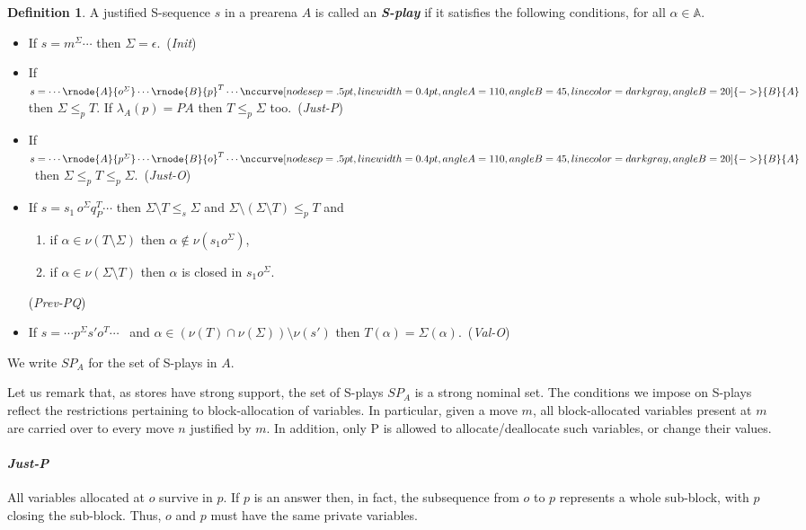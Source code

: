 \documentclass{CSML}
\theoremstyle{definition}\newtheorem{definition}[thm]{Definition}
\theoremstyle{definition}\newtheorem{example}[thm]{Example}
\theoremstyle{definition}\newtheorem{proposition}[thm]{Proposition}
\theoremstyle{definition}\newtheorem{lemma}[thm]{Lemma}
\theoremstyle{definition}\newtheorem{theorem}[thm]{Theorem}
\theoremstyle{definition}\newtheorem{corollary}[thm]{Corollary}
\theoremstyle{definition}\newtheorem{remark}[thm]{Remark}
\renewcommand\Sigma{\varSigma}
\newcommand\justf[3][]{\nccurve[nodesep=.5pt,linewidth=0.4pt,angleA=110,angleB=45,linecolor=darkgray#1]{->}{#2}{#3}}
\newcommand\Tau{T}
\newcommand\ee\epsilon
\newcommand\remv{\setminus}
\newcommand\Splays[1]{\mathit{SP}_{#1}}
\newcommand\boldemph[1]{\emph{\textbf{#1}}}
\newcommand\A{\mathbb{A}}
\newcommand\Substore{\leq_p}
\newcommand\substorE{\leq_s}
\newcommand\na\alpha
\begin{document}
\begin{definition}\label{def:splay}
A justified S-sequence $s$ in a prearena $A$ is called an \boldemph{S-play} if it satisfies the following conditions, for all $\na\in\A$.
\begin{itemize}
  \item If $s=m^\Sigma\cdots$ then $\Sigma=\ee$.\ ({\em Init})
  \item If $s=\cdots \rnode{A}{o^{\Sigma}}\cdots \rnode{B}{p}^\Tau\cdots\justf[,angleB=20]{B}{A}$ then $\Sigma\Substore\Tau$. If $\lambda_A(p)=PA$ then $\Tau\Substore\Sigma$ too.\ ({\em Just-P})
 \item If $s=\cdots \rnode{A}{p^{\Sigma}} \cdots \rnode{B}{o}^\Tau\cdots\justf[,angleB=20]{B}{A}$ \ then $\Sigma\Substore\Tau\Substore\Sigma$.\ ({\em Just-O})
  \item If $s=s_1\, o^\Sigma q_P^\Tau\cdots$ then $\Sigma\remv\Tau\substorE\Sigma$ and $\Sigma\remv(\Sigma\remv\Tau)\Substore\Tau$ and 
  \begin{enumerate}[label=\({\alph*}]\item if $\na\in\nu(\Tau\remv\Sigma)$ then $\na\notin\nu(s_1o^\Sigma)$,
    \item if $\na\in\nu(\Sigma\remv\Tau)$ then $\na$ is closed in $s_1o^\Sigma$.
  \end{enumerate}({\em Prev-PQ})
  \item If $s=\cdots p^\Sigma s'o^\Tau\cdots$ \ and $\na\in(\nu(\Tau)\cap\nu(\Sigma))\setminus\nu(s')$ then $\Tau(\na)=\Sigma(\na)$.\ ({\em Val-O})
\end{itemize}
We write $\Splays{A}$ for the set of S-plays in $A$.
\end{definition}

Let us remark that, as stores have strong support, the set of S-plays $\Splays{A}$ is a strong nominal set.
The conditions we impose on S-plays reflect the restrictions pertaining to block-allocation of variables. In particular, given a move $m$, all block-allocated variables present at $m$ are carried over to every move $n$ justified by $m$. In addition, only P is allowed to allocate/deallocate such variables, or change their values.

\paragraph{\bf\em Just-P}
All variables allocated at $o$ survive in $p$. If $p$ is an answer then, in fact, the subsequence from $o$ to $p$ represents a whole {sub-}block, with $p$ closing the {sub-}block. Thus, $o$ and $p$ must have the same private variables.
\end{document}
